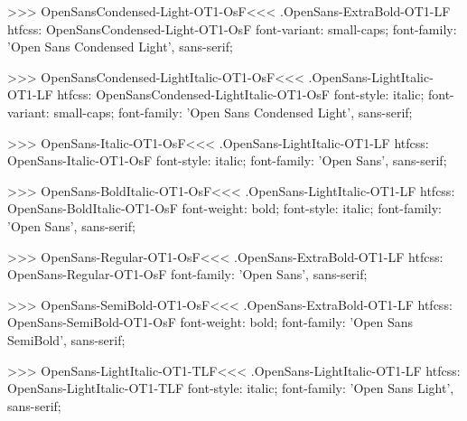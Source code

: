 >>>
\<OpenSansCondensed-Light-OT1-OsF\><<<
.OpenSans-ExtraBold-OT1-LF
htfcss:  OpenSansCondensed-Light-OT1-OsF  font-variant: small-caps; font-family: 'Open Sans Condensed Light', sans-serif;

>>>
\<OpenSansCondensed-LightItalic-OT1-OsF\><<<
.OpenSans-LightItalic-OT1-LF
htfcss:  OpenSansCondensed-LightItalic-OT1-OsF  font-style: italic; font-variant: small-caps; font-family: 'Open Sans Condensed Light', sans-serif;

>>>
\<OpenSans-Italic-OT1-OsF\><<<
.OpenSans-LightItalic-OT1-LF
htfcss:  OpenSans-Italic-OT1-OsF  font-style: italic; font-family: 'Open Sans', sans-serif;

>>>
\<OpenSans-BoldItalic-OT1-OsF\><<<
.OpenSans-LightItalic-OT1-LF
htfcss:  OpenSans-BoldItalic-OT1-OsF  font-weight: bold; font-style: italic; font-family: 'Open Sans', sans-serif;

>>>
\<OpenSans-Regular-OT1-OsF\><<<
.OpenSans-ExtraBold-OT1-LF
htfcss:  OpenSans-Regular-OT1-OsF  font-family: 'Open Sans', sans-serif;

>>>
\<OpenSans-SemiBold-OT1-OsF\><<<
.OpenSans-ExtraBold-OT1-LF
htfcss:  OpenSans-SemiBold-OT1-OsF  font-weight: bold; font-family: 'Open Sans SemiBold', sans-serif;

>>>
\<OpenSans-LightItalic-OT1-TLF\><<<
.OpenSans-LightItalic-OT1-LF
htfcss:  OpenSans-LightItalic-OT1-TLF  font-style: italic; font-family: 'Open Sans Light', sans-serif;

